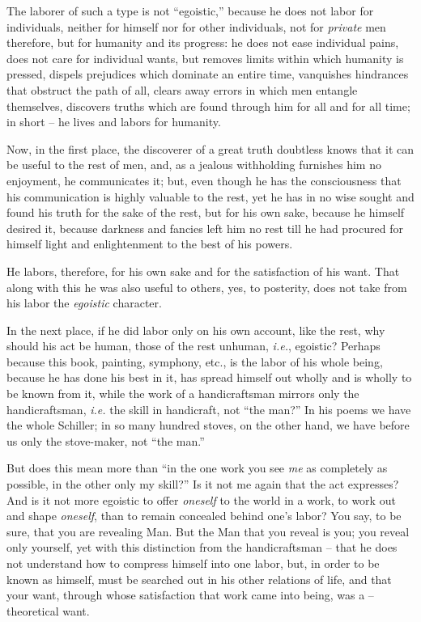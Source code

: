\documentclass[12pt,a4paper]{book}
\begin{document}
The laborer of such a type is not ``egoistic,'' because he does not labor 
for individuals, neither for himself nor for other individuals, not for 
\textit{private} men therefore, but for humanity and its progress: he does not 
ease individual pains, does not care for individual wants, but removes limits 
within which humanity is pressed, dispels prejudices which dominate an entire 
time, vanquishes hindrances that obstruct the path of all, clears away errors 
in which men entangle themselves, discovers truths which are found through him 
for all and for all time; in short -- he lives and labors for humanity.

Now, in the first place, the discoverer of a great truth doubtless knows that 
it can be useful to the rest of men, and, as a jealous withholding furnishes 
him no enjoyment, he communicates it; but, even though he has the 
consciousness that his communication is highly valuable to the rest, yet he 
has in no wise sought and found his truth for the sake of the rest, but for 
his own sake, because he himself desired it, because darkness and fancies left 
him no rest till he had procured for himself light and enlightenment to the 
best of his powers.

He labors, therefore, for his own sake and for the satisfaction of his want. 
That along with this he was also useful to others, yes, to posterity, does not 
take from his labor the \textit{egoistic} character.

In the next place, if he did labor only on his own account, like the rest, why 
should his act be human, those of the rest unhuman, \textit{i.e.}, egoistic? 
Perhaps because this book, painting, symphony, etc., is the labor of his whole 
being, because he has done his best in it, has spread himself out wholly and 
is wholly to be known from it, while the work of a handicraftsman mirrors only 
the handicraftsman, \textit{i.e.} the skill in handicraft, not ``the man?'' 
In his poems we have the whole Schiller; in so many hundred stoves, on the 
other hand, we have before us only the stove-maker, not ``the man.''

But does this mean more than ``in the one work you see \textit{me} as 
completely as possible, in the other only my skill?'' Is it not me again that 
the act expresses? And is it not more egoistic to offer \textit{oneself} to 
the world in a work, to work out and shape \textit{oneself}, than to remain 
concealed behind one's labor? You say, to be sure, that you are revealing Man. 
But the Man that you reveal is you; you reveal only yourself, yet with this 
distinction from the handicraftsman -- that he does not understand how to 
compress himself into one labor, but, in order to be known as himself, must be 
searched out in his other relations of life, and that your want, through whose 
satisfaction that work came into being, was a -- theoretical want.
\end{document}
